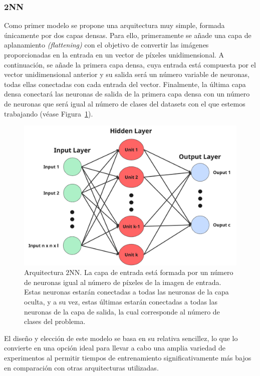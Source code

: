 \subsubsection{2NN}\label{subsubsec:2NN}

Como primer modelo se propone una arquitectura muy simple, formada únicamente por dos capas densas. Para ello, primeramente se añade una capa de aplanamiento \textit{(flattening)} con el objetivo de convertir las imágenes proporcionadas en la entrada en un vector de píxeles unidimensional. A continuación, se añade la primera capa densa, cuya entrada está compuesta por el vector unidimensional anterior y su salida será un número variable de neuronas, todas ellas conectadas con cada entrada del vector. Finalmente, la última capa densa conectará las neuronas de salida de la primera capa densa con un número de neuronas que será igual al número de clases del datasets con el que estemos trabajando (véase Figura~\ref{fig:arquitecura2nn}).\newline

\begin{figure}[h]
    \centering
    \includegraphics[width=0.6\linewidth]{img/arquitectura2nn.png}
    \caption[Arquitectura $2$NN.]{Arquitectura $2$NN. La capa de entrada está formada por un número de neuronas igual al número de píxeles de la imagen de entrada. Estas neuronas estarán conectadas a todas las neuronas de la capa oculta, y a su vez, estas últimas estarán conectadas a todas las neuronas de la capa de salida, la cual corresponde al número de clases del problema.}\label{fig:arquitecura2nn}
\end{figure}

El diseño y elección de este modelo se basa en su relativa sencillez, lo que lo convierte en una opción ideal para llevar a cabo una amplia variedad de experimentos al permitir tiempos de entrenamiento significativamente más bajos en comparación con otras arquitecturas utilizadas.\newline

